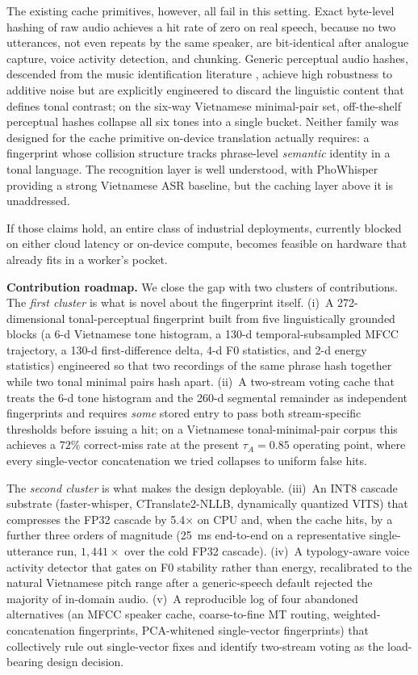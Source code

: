 \documentclass[a4paper,fleqn]{cas-dc}
\begin{document}
The existing cache primitives, however, all fail in this setting. Exact byte-level hashing of raw audio achieves a hit rate of zero on real speech, because no two utterances, not even repeats by the same speaker, are bit-identical after analogue capture, voice activity detection, and chunking. Generic perceptual audio hashes, descended from the music identification literature \citep{wang2003shazam}, achieve high robustness to additive noise but are explicitly engineered to discard the linguistic content that defines tonal contrast; on the six-way Vietnamese minimal-pair set, off-the-shelf perceptual hashes collapse all six tones into a single bucket. Neither family was designed for the cache primitive on-device translation actually requires: a fingerprint whose collision structure tracks phrase-level \emph{semantic} identity in a tonal language. The recognition layer is well understood, with PhoWhisper \citep{le2024phowhisper} providing a strong Vietnamese ASR baseline, but the caching layer above it is unaddressed.

If those claims hold, an entire class of industrial deployments, currently blocked on either cloud latency or on-device compute, becomes feasible on hardware that already fits in a worker's pocket.

\textbf{Contribution roadmap.} We close the gap with two clusters of contributions. The \emph{first cluster} is what is novel about the fingerprint itself. (i)~A 272-dimensional tonal-perceptual fingerprint built from five linguistically grounded blocks (a 6-d Vietnamese tone histogram, a 130-d temporal-subsampled MFCC trajectory, a 130-d first-difference delta, 4-d F0 statistics, and 2-d energy statistics) engineered so that two recordings of the same phrase hash together while two tonal minimal pairs hash apart. (ii)~A two-stream voting cache that treats the 6-d tone histogram and the 260-d segmental remainder as independent fingerprints and requires \emph{some} stored entry to pass both stream-specific thresholds before issuing a hit; on a Vietnamese tonal-minimal-pair corpus this achieves a $72\%$ correct-miss rate at the present $\tau_{A}=0.85$ operating point, where every single-vector concatenation we tried collapses to uniform false hits.

The \emph{second cluster} is what makes the design deployable. (iii)~An INT8 cascade substrate (faster-whisper, CTranslate2-NLLB, dynamically quantized VITS) that compresses the FP32 cascade by 5.4$\times$ on CPU and, when the cache hits, by a further three orders of magnitude (25~ms end-to-end on a representative single-utterance run, $1{,}441\times$ over the cold FP32 cascade). (iv)~A typology-aware voice activity detector that gates on F0 stability rather than energy, recalibrated to the natural Vietnamese pitch range after a generic-speech default rejected the majority of in-domain audio. (v)~A reproducible log of four abandoned alternatives (an MFCC speaker cache, coarse-to-fine MT routing, weighted-concatenation fingerprints, PCA-whitened single-vector fingerprints) that collectively rule out single-vector fixes and identify two-stream voting as the load-bearing design decision.
\end{document}
